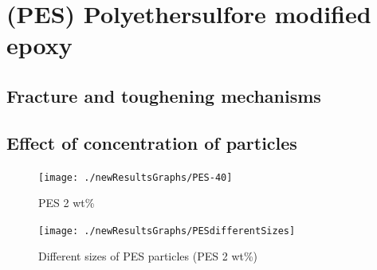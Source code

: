 \documentclass[numbers=noendperiod,chapterprefix=on]{icldt} %
\begin{document}
{%
%
%
%
%
%
%
%



 
 
\section{(PES) Polyethersulfore modified epoxy} \label{PES_SEM}

\subsection{Fracture and toughening mechanisms}

\subsection{Effect of concentration of particles}

\begin{figure}[!hp]
\centering
\texttt{[image: ./newResultsGraphs/PES-40]}
\caption{PES 2 wt\%} \label{PES-40}
\end{figure}
\FloatBarrier

\begin{figure}[!hp]
\centering
\texttt{[image: ./newResultsGraphs/PESdifferentSizes]}
\caption{Different sizes of PES particles (PES 2 wt\%)} \label{differentsizesPES}
\end{figure}
\FloatBarrier

}
\end{document}

